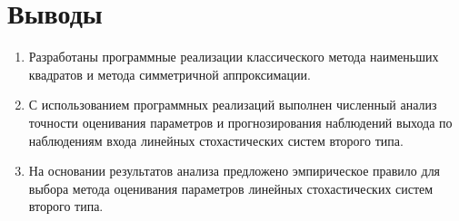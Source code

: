 \section{Выводы}

\begin{enumerate}
\item Разработаны программные реализации классического метода наименьших
  квадратов и метода симметричной аппроксимации.
\item С использованием программных реализаций выполнен численный анализ
  точности оценивания параметров и прогнозирования наблюдений выхода
  по наблюдениям входа линейных стохастических систем второго типа.
\item На основании результатов анализа предложено эмпирическое правило
  для выбора метода оценивания параметров линейных стохастических
  систем второго типа.
\end{enumerate}
